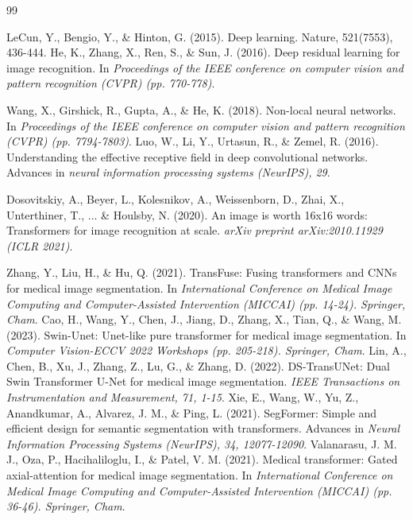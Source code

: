\documentclass[runningheads]{llncs}
\begin{document}
\begin{thebibliography}{99}


LeCun, Y., Bengio, Y., \& Hinton, G. (2015). Deep learning. Nature, 521(7553), 436-444.
He, K., Zhang, X., Ren, S., \& Sun, J. (2016). Deep residual learning for image recognition. In \textit{Proceedings of the IEEE conference on computer vision and pattern recognition (CVPR) (pp. 770-778)}.

Wang, X., Girshick, R., Gupta, A., \& He, K. (2018). Non-local neural networks. In \textit{Proceedings of the IEEE conference on computer vision and pattern recognition (CVPR) (pp. 7794-7803)}. 
 Luo, W., Li, Y., Urtasun, R., \& Zemel, R. (2016). Understanding the effective receptive field in deep convolutional networks. Advances in \textit{neural information processing systems (NeurIPS), 29}. 

Dosovitskiy, A., Beyer, L., Kolesnikov, A., Weissenborn, D., Zhai, X., Unterthiner, T., ... \& Houlsby, N. (2020). An image is worth 16x16 words: Transformers for image recognition at scale. \textit{arXiv preprint arXiv:2010.11929 (ICLR 2021)}.  

Zhang, Y., Liu, H., \& Hu, Q. (2021). TransFuse: Fusing transformers and CNNs for medical image segmentation. In \textit{International Conference on Medical Image Computing and Computer-Assisted Intervention (MICCAI) (pp. 14-24). Springer, Cham}.
Cao, H., Wang, Y., Chen, J., Jiang, D., Zhang, X., Tian, Q., \& Wang, M. (2023). Swin-Unet: Unet-like pure transformer for medical image segmentation. In \textit{Computer Vision-ECCV 2022 Workshops (pp. 205-218). Springer, Cham}.
Lin, A., Chen, B., Xu, J., Zhang, Z., Lu, G., \& Zhang, D. (2022). DS-TransUNet: Dual Swin Transformer U-Net for medical image segmentation. \textit{IEEE Transactions on Instrumentation and Measurement, 71, 1-15}.
Xie, E., Wang, W., Yu, Z., Anandkumar, A., Alvarez, J. M., \& Ping, L. (2021). SegFormer: Simple and efficient design for semantic segmentation with transformers. Advances in \textit{Neural Information Processing Systems (NeurIPS), 34, 12077-12090}.
Valanarasu, J. M. J., Oza, P., Hacihaliloglu, I., \& Patel, V. M. (2021). Medical transformer: Gated axial-attention for medical image segmentation. In \textit{International Conference on Medical Image Computing and Computer-Assisted Intervention (MICCAI) (pp. 36-46). Springer, Cham}.



\end{thebibliography}
\end{document}
